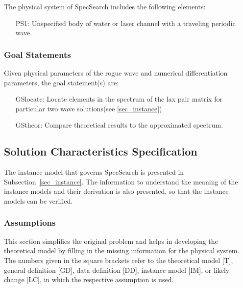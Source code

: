 \documentclass[12pt]{article}
\begin{document}
The physical system of SpecSearch includes the following elements:

\begin{itemize}

\item[PS1:] 
Unspecified body of water or laser channel with a traveling periodic 
wave.

\end{itemize}

\subsubsection{Goal Statements}

\noindent Given physical parameters of the rogue wave and numerical 
differentiation parameters, the goal 
statement(s) are:

\begin{itemize}[leftmargin=.75in]

\item[GSlocate:] {Locate elements in the spectrum of the lax pair matrix for 
particular two wave solutions(see 
\ref{sec_instance}) }
\item[GStheor:] {Compare theoretical results to the approximated spectrum.}

\end{itemize}

\subsection{Solution Characteristics Specification}

The instance model that governs SpecSearch is presented in
Subsection~\ref{sec_instance}.  The information to understand the meaning of the
instance models and their derivation is also presented, so that the instance
models can be verified.

\subsubsection{Assumptions}

This section simplifies the original problem and helps in developing the
theoretical model by filling in the missing information for the physical
system. The numbers given in the square brackets refer to the theoretical model
[T], general definition [GD], data definition [DD], instance model [IM], or
likely change [LC], in which the respective assumption is used.
\end{document}
